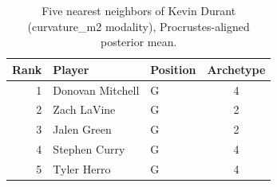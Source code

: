 \begin{table}[htbp]
  \centering\small
  \begin{tabular}{rllc}
    \toprule
    Rank & Player & Position & Archetype \\
    \midrule
    1 & Donovan Mitchell & G & 4 \\
    2 & Zach LaVine & G & 2 \\
    3 & Jalen Green & G & 2 \\
    4 & Stephen Curry & G & 4 \\
    5 & Tyler Herro & G & 4 \\
    \bottomrule
  \end{tabular}
  \caption{Five nearest neighbors of Kevin Durant (curvature_m2 modality), Procrustes-aligned posterior mean.}
  \label{tab:Kevin_Durant_neighbors_curvature_m2}
\end{table}

